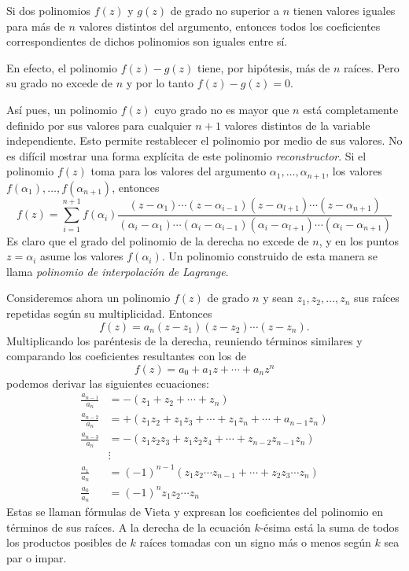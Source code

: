 \begin{tcolorbox}[
        theorem style=change break,
        enhanced,
        breakable,
        boxrule=0pt,
        frame hidden,
        borderline west={3pt}{0pt}{black},
        colback=gray!20,
        coltitle=gray!90,
        attach title to upper={\ },
        sharp corners,
        fonttitle=\bfseries,
        fontupper=\normalsize
    ]
    Si dos polinomios $f(z)$ y $g(z)$ de grado no superior a $n$ tienen valores iguales para más de $n$ valores distintos del argumento, entonces todos los coeficientes correspondientes de dichos polinomios son iguales entre sí.
\end{tcolorbox}

En efecto, el polinomio $f(z) - g (z)$ tiene, por hipótesis, más de $n$ raíces. Pero su grado no excede de $n$ y por lo tanto $f (z) - g (z) = 0$.

Así pues, un polinomio $f(z)$ cuyo grado no es mayor que $n$ está completamente definido por sus valores para cualquier $n + 1$ valores distintos de la variable independiente. Esto permite restablecer el polinomio por medio de sus valores. No es difícil mostrar una forma explícita de este polinomio \textit{reconstructor}. Si el polinomio $f(z)$ toma para los valores del argumento $\alpha_1,  \dots,  \alpha_{n+1}$, los valores $f(\alpha_1),  \dots,  f(\alpha_{n+1})$, entonces
$$f(z)=\sum_{i=1}^{n+1} f(\alpha_i) \frac{(z-\alpha_1) \cdots (z-\alpha_{i-1})(z-\alpha_{l+1}) \cdots (z-\alpha_{n+1})}{(\alpha_i - \alpha_1) \cdots (\alpha_i - \alpha_{i-1})(\alpha_i - \alpha_{l+1}) \cdots (\alpha_i - \alpha_{n+1})}$$
Es claro que el grado del polinomio de la derecha no excede de $n$, y en los puntos $z = \alpha_i$ asume los valores $f (\alpha_i)$. Un polinomio construido de esta manera se llama \textit{polinomio de interpolación de Lagrange}.

Consideremos ahora un polinomio $f(z)$ de grado $n$ y sean $z_1,  z_2,  \dots,  z_n$ sus raíces repetidas según su multiplicidad. Entonces
$$f(z)=a_n (z-z_1)(z-z_2) \cdots (z-z_n).$$
Multiplicando los paréntesis de la derecha, reuniendo términos similares y comparando los coeficientes resultantes con los de
$$f(z)=a_0+a_1z+ \cdots + a_nz^n$$
podemos derivar las siguientes ecuaciones:
\begin{align*}
    \frac{a_{n-1}}{a_n} &= - (z_1 + z_2 + \cdots + z_n) \\ 
    \frac{a_{n-2}}{a_n} &= + (z_1z_2 + z_1z_3 + \cdots +z_1z_n + \cdots + a_{n-1}z_n) \\ 
    \frac{a_{n-3}}{a_n} &= - (z_1z_2z_3 + z_1z_2z_4 + \cdots + z_{n-2}z_{n-1}z_n) \\ 
    & \vdots \\ 
    \frac{a_1}{a_n} &= (-1)^{n-1} (z_1z_2 \cdots z_{n-1} + \cdots + z_2z_3 \cdots z_n) \\ 
    \frac{a_0}{a_n} &= (-1)^n z_1z_2 \cdots z_n
\end{align*}
Estas se llaman fórmulas de Vieta y expresan los coeficientes del polinomio en términos de sus raíces. A la derecha de la ecuación $k$-ésima está la suma de todos los productos posibles de $k$ raíces tomadas con un signo más o menos según $k$ sea par o impar.

